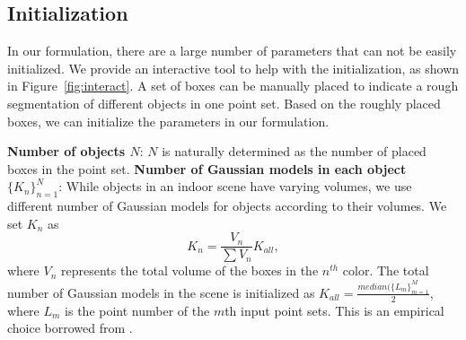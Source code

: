 \subsection{Initialization}
\label{sec:imp:interact}
%
In our formulation, there are a large number of parameters that can not be easily initialized.
%
We provide an interactive tool to help with the initialization, as shown in Figure~\ref{fig:interact}. 
A set of boxes can be manually placed to indicate a rough segmentation of different objects in one point set.
%
Based on the roughly placed boxes, we can initialize the parameters in our formulation. 

\noindent\textbf{Number of objects $N$}: $N$ is naturally determined as the number of placed boxes in the point set.
%
\noindent\textbf{Number of Gaussian models in each object $\{K_n\}^N_{n=1}$}: While objects in an indoor scene have varying volumes, we use different number of Gaussian models for objects according to their volumes. We set $K_n$ as 
\begin{equation}
\label{equ:K_n}
K_n=\frac{V_n}{\sum V_n}K_{all},
\end{equation}
%
where $V_n$ represents the total volume of the boxes in the $n^{th}$ color. 
The total number of Gaussian models in the scene is initialized as $K_{all}=\frac{median(\{L_m\}^M_{m=1}}{2}$, where $L_m$ is the point number of the $m$th input point sets. 
This is an empirical choice borrowed from \cite{Evangelidis2014}.

